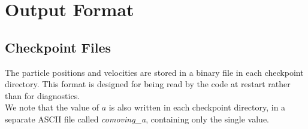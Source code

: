 %
%
%

\section{Output Format}

\subsection{Checkpoint Files}

The particle positions and velocities are stored in a binary file in each checkpoint directory.  
This format is designed for being read by the code at restart rather than for diagnostics. \\

We note that the value of $a$ is also written in each checkpoint directory, 
in a separate ASCII file called {\em comoving\_a}, containing only the single value. \\

